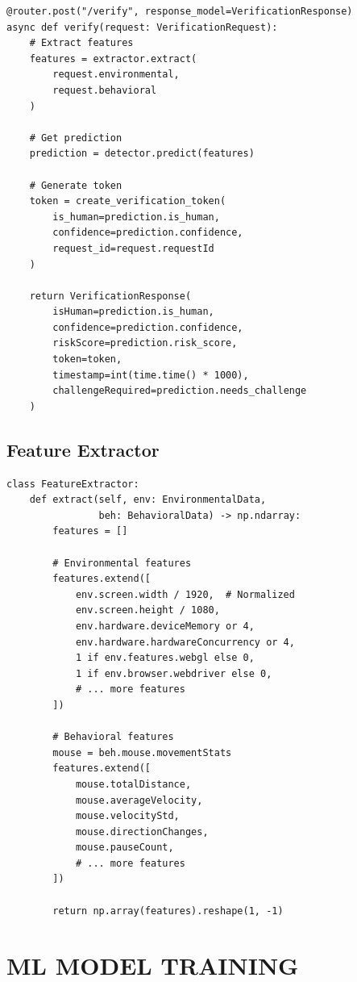 \begin{verbatim}
@router.post("/verify", response_model=VerificationResponse)
async def verify(request: VerificationRequest):
    # Extract features
    features = extractor.extract(
        request.environmental,
        request.behavioral
    )
    
    # Get prediction
    prediction = detector.predict(features)
    
    # Generate token
    token = create_verification_token(
        is_human=prediction.is_human,
        confidence=prediction.confidence,
        request_id=request.requestId
    )
    
    return VerificationResponse(
        isHuman=prediction.is_human,
        confidence=prediction.confidence,
        riskScore=prediction.risk_score,
        token=token,
        timestamp=int(time.time() * 1000),
        challengeRequired=prediction.needs_challenge
    )
\end{verbatim}

\subsection{Feature Extractor}

\begin{verbatim}
class FeatureExtractor:
    def extract(self, env: EnvironmentalData, 
                beh: BehavioralData) -> np.ndarray:
        features = []
        
        # Environmental features
        features.extend([
            env.screen.width / 1920,  # Normalized
            env.screen.height / 1080,
            env.hardware.deviceMemory or 4,
            env.hardware.hardwareConcurrency or 4,
            1 if env.features.webgl else 0,
            1 if env.browser.webdriver else 0,
            # ... more features
        ])
        
        # Behavioral features
        mouse = beh.mouse.movementStats
        features.extend([
            mouse.totalDistance,
            mouse.averageVelocity,
            mouse.velocityStd,
            mouse.directionChanges,
            mouse.pauseCount,
            # ... more features
        ])
        
        return np.array(features).reshape(1, -1)
\end{verbatim}

\section{ML MODEL TRAINING}

